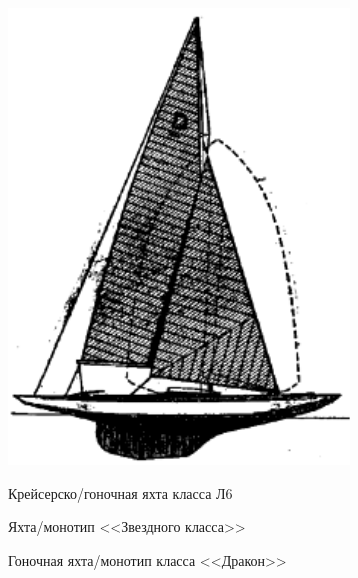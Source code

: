 \documentclass[a4paper, 12pt, twoside, final]{scrbook}
\begin{document}
\begin{figure}[htbp]
	\hfill{}\includegraphics[scale=0.7]{Dragon}%
	\hfill{}

	\hfill{}%
	\begin{minipage}[t]{0.3\columnwidth}%
		\protect\caption{\label{fig:18}Крейсерско\-/гоночная яхта класса Л6}%
	\end{minipage}%
	\hfill{}%
	\begin{minipage}[t]{0.3\columnwidth}%
		\protect\caption{\label{fig:20}Яхта\-/монотип <<Звездного класса>>}%
	\end{minipage}%
	\hfill{}%
	\begin{minipage}[t]{0.3\columnwidth}%
\protect\caption{\label{fig:21}Гоночная яхта\-/монотип класса <<Дракон>>}%
	\end{minipage}%
	\hfill{}


\end{figure}
\end{document}
